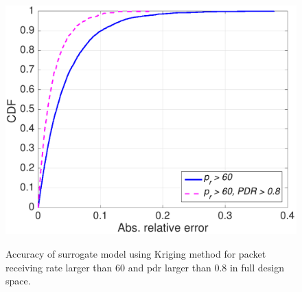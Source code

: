 


\begin{figure}[t]
    \centering
{\includegraphics[width=0.8\columnwidth]{figures/full_constrain_L60_PDR_08}}
  \caption{Accuracy of surrogate model using Kriging method for packet receiving rate larger than 60 and \gls{pdr} larger than 0.8 in full design space. \label{fig:cdf_constraint}}
\end{figure}






